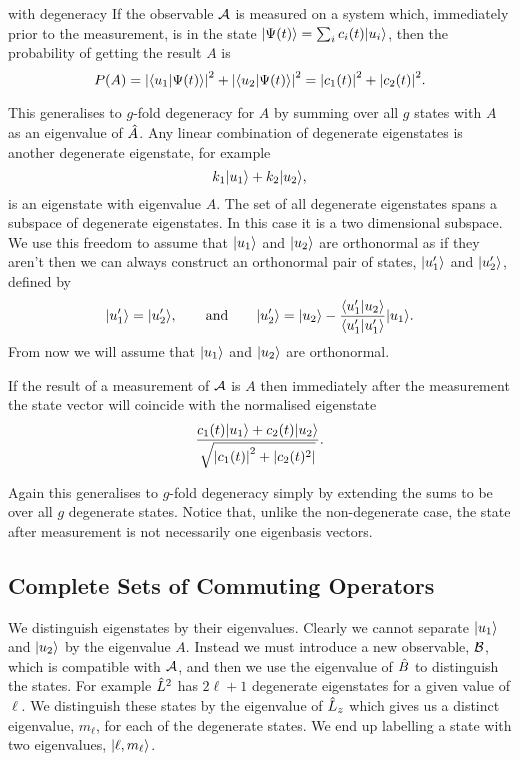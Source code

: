 \setcounter{postulateCounter}{2}
\begin{postulate}{with degeneracy}{}
    If the observable \(\mathcal{A}\) is measured on a system which, immediately prior to the measurement, is in the state \(\vert {\Psi(t)} \rangle = \sum_i c_i(t)\vert {u_i} \rangle\), then the probability of getting the result \(A\) is
    \[P(A) = \abs{\langle {u_1} \vert {\Psi(t)} \rangle}^2 + \abs{\langle {u_2} \vert {\Psi(t)} \rangle}^2 = \abs{c_1(t)}^2 + \abs{c_2(t)}^2.\]
\end{postulate}
This generalises to \(g\)-fold degeneracy for \(A\) by summing over all \(g\) states with \(A\) as an eigenvalue of \(\hat{A}\).
Any linear combination of degenerate eigenstates is another degenerate eigenstate, for example
\[k_1\vert {u_1} \rangle + k_2\vert {u_2} \rangle,\]
is an eigenstate with eigenvalue \(A\).
The set of all degenerate eigenstates spans a subspace of degenerate eigenstates.
In this case it is a two dimensional subspace.
We use this freedom to assume that \(\vert {u_1} \rangle\) and \(\vert {u_2} \rangle\) are orthonormal as if they aren't then we can always construct an orthonormal pair of states, \(\vert {u_1'} \rangle\) and \(\vert {u_2'} \rangle\), defined by
\[\vert {u_1'} \rangle = \vert {u_2'} \rangle, \qquad\text{and}\qquad \vert {u_2'} \rangle = \vert {u_2} \rangle - \frac{\langle {u_1'} \vert {u_2} \rangle}{\langle {u_1'} \vert {u_1'} \rangle}\vert {u_1} \rangle.\]
From now we will assume that \(\vert {u_1} \rangle\) and \(\vert {u_2} \rangle\) are orthonormal.
\begin{postulate}{}{}
    If the result of a measurement of \(\mathcal{A}\) is \(A\) then immediately after the measurement the state vector will coincide with the normalised eigenstate
    \[\frac{c_1(t)\vert {u_1} \rangle + c_2(t)\vert {u_2} \rangle}{\sqrt{\abs{c_1(t)}^2 + \abs{c_2(t)^2}}}.\]
\end{postulate}
Again this generalises to \(g\)-fold degeneracy simply by extending the sums to be over all \(g\) degenerate states.
Notice that, unlike the non-degenerate case, the state after measurement is not necessarily one eigenbasis vectors.

\subsection{Complete Sets of Commuting Operators}
We distinguish eigenstates by their eigenvalues.
Clearly we cannot separate \(\vert {u_1} \rangle\) and \(\vert {u_2} \rangle\) by the eigenvalue \(A\).
Instead we must introduce a new observable, \(\mathcal{B}\), which is compatible with \(\mathcal{A}\), and then we use the eigenvalue of \(\hat{B}\) to distinguish the states.
For example \(\hat{L}^2\) has \(2\ell + 1\) degenerate eigenstates for a given value of \(\ell\).
We distinguish these states by the eigenvalue of \(\hat{L}_z\) which gives us a distinct eigenvalue, \(m_\ell\), for each of the degenerate states.
We end up labelling a state with two eigenvalues, \(\vert {\ell, m_\ell} \rangle\).

